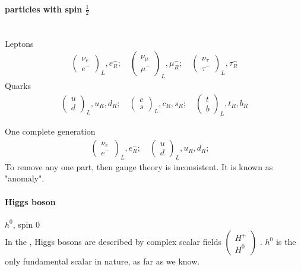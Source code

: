 \paragraph{particles with spin $ \frac{1}{2} $} \hspace{0pt} \\
Leptons
\begin{align*}
   \begin{pmatrix} \nu_e \\ e^- \end{pmatrix}_L , e^-_R ;\quad
   \begin{pmatrix} \nu_\mu \\ \mu^- \end{pmatrix}_L, \mu_R^-; \quad
   \begin{pmatrix} \nu_\tau \\ \tau^- \end{pmatrix}_L, \tau_R^- 
\end{align*}
Quarks
\begin{align*}
   \begin{pmatrix} u \\ d \end{pmatrix}_L, u_R, d_R; \quad
   \begin{pmatrix} c \\ s\end{pmatrix}_L, c_R, s_R; \quad
   \begin{pmatrix} t \\ b\end{pmatrix}_L, t_R, b_R
\end{align*}

One complete generation
\begin{align*}
   \begin{pmatrix} \nu_e \\ e^- \end{pmatrix}_L , e^-_R ;\quad 
   \begin{pmatrix} u \\ d \end{pmatrix}_L, u_R, d_R; \quad
\end{align*}
To remove any one part, then gauge theory is inconsistent. It is known as "anomaly". 

\paragraph{Higgs boson} $h^0$, spin $0$ \\
In the \sm, Higgs bosons are described by complex scalar fields $\begin{pmatrix} H^+ \\ H^0 \end{pmatrix} $ . $h^0$ is the only fundamental scalar in nature, as far as we know.

